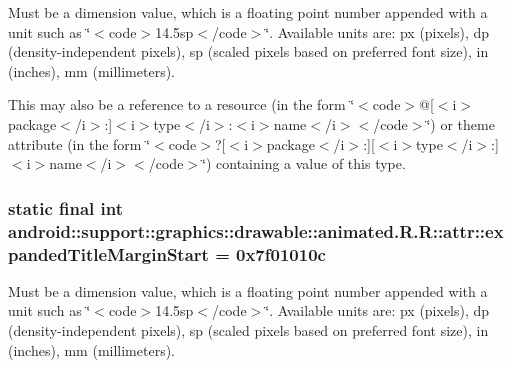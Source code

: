 Must be a dimension value, which is a floating point number appended with a unit such as \char`\"{}$<$code$>$14.5sp$<$/code$>$\char`\"{}. Available units are: px (pixels), dp (density-independent pixels), sp (scaled pixels based on preferred font size), in (inches), mm (millimeters). 

This may also be a reference to a resource (in the form \char`\"{}$<$code$>$@\mbox{[}$<$i$>$package$<$/i$>$:\mbox{]}$<$i$>$type$<$/i$>$:$<$i$>$name$<$/i$>$$<$/code$>$\char`\"{}) or theme attribute (in the form \char`\"{}$<$code$>$?\mbox{[}$<$i$>$package$<$/i$>$:\mbox{]}\mbox{[}$<$i$>$type$<$/i$>$:\mbox{]}$<$i$>$name$<$/i$>$$<$/code$>$\char`\"{}) containing a value of this type. \hypertarget{classandroid_1_1support_1_1graphics_1_1drawable_1_1animated_1_1_r_1_1attr_1aebd92bf196bed3950d3dd1addee9e7}{
\subsubsection[{expandedTitleMarginStart}]{\setlength{\rightskip}{0pt plus 5cm}static final int android::support::graphics::drawable::animated.R.R::attr::expandedTitleMarginStart = 0x7f01010c}}
\label{classandroid_1_1support_1_1graphics_1_1drawable_1_1animated_1_1_r_1_1attr_1aebd92bf196bed3950d3dd1addee9e7}


Must be a dimension value, which is a floating point number appended with a unit such as \char`\"{}$<$code$>$14.5sp$<$/code$>$\char`\"{}. Available units are: px (pixels), dp (density-independent pixels), sp (scaled pixels based on preferred font size), in (inches), mm (millimeters). 

